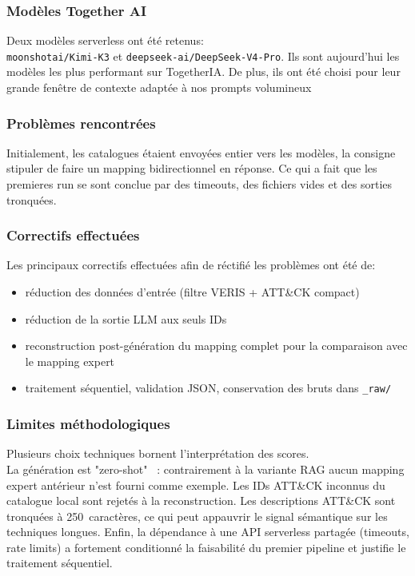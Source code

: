 \documentclass[a4paper,12pt]{article}
\begin{document}
\subsubsection{Modèles Together AI}
Deux modèles serverless ont été retenus:\\
\texttt{moonshotai/Kimi-K3} et \texttt{deepseek-ai/DeepSeek-V4-Pro}. Ils sont aujourd'hui les modèles les plus performant sur TogetherIA. De plus, ils ont été choisi pour leur grande fenêtre de contexte adaptée à nos prompts volumineux

\subsubsection{Problèmes rencontrées}
Initialement, les catalogues étaient envoyées entier vers les modèles, la consigne stipuler de faire un mapping bidirectionnel en réponse. Ce qui a fait que les premieres run se sont conclue par des timeouts, des fichiers vides et des sorties tronquées. 

\subsubsection{Correctifs effectuées}\label{subsubsec:correctif}
Les principaux correctifs effectuées afin de réctifié les problèmes ont été de:
\begin{itemize}
	\item réduction des données d'entrée (filtre VERIS + ATT\&CK compact)
	\item réduction de la sortie LLM aux seuls IDs 
	\item reconstruction post-génération du mapping complet pour la comparaison avec le mapping expert
	\item traitement séquentiel, validation JSON, conservation des bruts dans \texttt{\_raw/}
\end{itemize}

\subsubsection{Limites méthodologiques}
Plusieurs choix techniques bornent l'interprétation des scores.\\
La génération est "zero-shot" ~: contrairement à la variante RAG aucun mapping expert antérieur n'est fourni comme exemple. Les IDs ATT\&CK inconnus du catalogue local sont rejetés à la reconstruction.
Les descriptions ATT\&CK sont tronquées à 250~caractères, ce qui peut appauvrir le signal sémantique sur les techniques longues.
Enfin, la dépendance à une API serverless partagée (timeouts, rate limits) a fortement conditionné la faisabilité du premier pipeline et justifie le traitement séquentiel.
\end{document}
